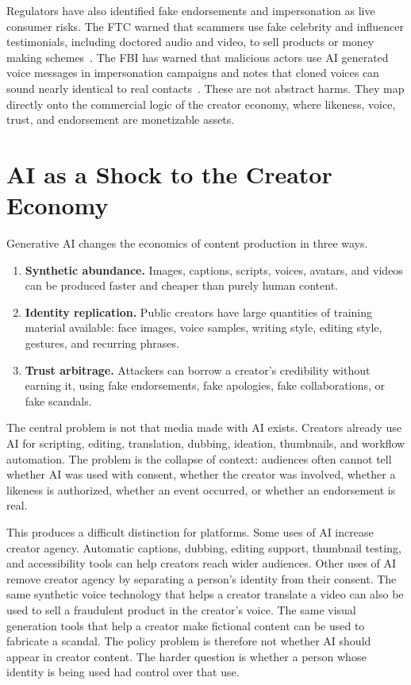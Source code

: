 \documentclass[11pt]{article}
\begin{document}
Regulators have also identified fake endorsements and impersonation as live consumer risks. The FTC warned that scammers use fake celebrity and influencer testimonials, including doctored audio and video, to sell products or money making schemes~\cite{ftc2024celebrity}. The FBI has warned that malicious actors use AI generated voice messages in impersonation campaigns and notes that cloned voices can sound nearly identical to real contacts~\cite{fbi2025officials}. These are not abstract harms. They map directly onto the commercial logic of the creator economy, where likeness, voice, trust, and endorsement are monetizable assets.

\section{AI as a Shock to the Creator Economy}

Generative AI changes the economics of content production in three ways.

\begin{enumerate}[leftmargin=*]
  \item \textbf{Synthetic abundance.} Images, captions, scripts, voices, avatars, and videos can be produced faster and cheaper than purely human content.
  \item \textbf{Identity replication.} Public creators have large quantities of training material available: face images, voice samples, writing style, editing style, gestures, and recurring phrases.
  \item \textbf{Trust arbitrage.} Attackers can borrow a creator's credibility without earning it, using fake endorsements, fake apologies, fake collaborations, or fake scandals.
\end{enumerate}

The central problem is not that media made with AI exists. Creators already use AI for scripting, editing, translation, dubbing, ideation, thumbnails, and workflow automation. The problem is the collapse of context: audiences often cannot tell whether AI was used with consent, whether the creator was involved, whether a likeness is authorized, whether an event occurred, or whether an endorsement is real.

This produces a difficult distinction for platforms. Some uses of AI increase creator agency. Automatic captions, dubbing, editing support, thumbnail testing, and accessibility tools can help creators reach wider audiences. Other uses of AI remove creator agency by separating a person's identity from their consent. The same synthetic voice technology that helps a creator translate a video can also be used to sell a fraudulent product in the creator's voice. The same visual generation tools that help a creator make fictional content can be used to fabricate a scandal. The policy problem is therefore not whether AI should appear in creator content. The harder question is whether a person whose identity is being used had control over that use.
\end{document}

